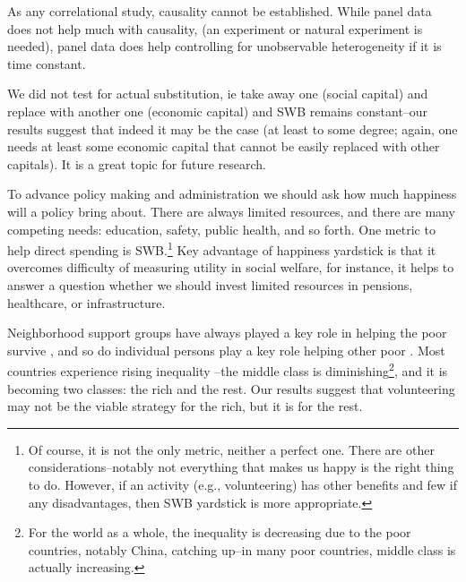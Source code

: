 \documentclass[10pt, letterpaper]{article}
\begin{document}
\begin{spacing}{1.4}
As any correlational study, causality cannot be established. While panel data
does not help much with causality,  (an experiment or natural experiment is
needed), panel data does help controlling for unobservable heterogeneity if it is
time constant. 

We did not test for actual substitution, ie take away one (social  capital) and replace
with another one (economic capital) and SWB remains constant--our results
suggest that indeed it may be the case (at least to some degree; again, one
needs at least some economic capital that cannot be easily replaced with other
capitals). It is a great topic for future research.

To advance policy making and
administration we should ask how much happiness will a policy bring
about. There are always limited resources, and there are many competing needs: education, safety, public
health, and so forth. One metric to help direct spending is SWB.\footnote{Of
  course, it is not the only metric, neither a perfect one. There are other
  considerations--notably not everything that makes us happy is the right thing
  to do. However, if an activity (e.g., volunteering) has other benefits and few if any
  disadvantages, then SWB yardstick is more appropriate.}
Key  advantage of happiness yardstick is that it overcomes difficulty
of measuring utility in social welfare, for instance, it helps to answer
a question whether we should  invest
limited resources in pensions, healthcare, or infrastructure.


Neighborhood support groups have always played a key role in helping the poor
survive \citep{saegert2002social}, and so do individual persons play a key role
helping other poor \citep{mazelis2017surviving}. Most countries experience
rising inequality \citep{piketty03,mackintosh13,oecd08,verbeek15}--the middle
class is diminishing\footnote{For the world as a whole, the inequality is
  decreasing due to the poor countries, notably China, catching up--in many poor
  countries, middle class is actually increasing.}, and it is becoming two classes: the rich and the
rest. Our results suggest that volunteering may not be the viable strategy for the rich, but it is for the rest.
 





\end{spacing}
\end{document}
